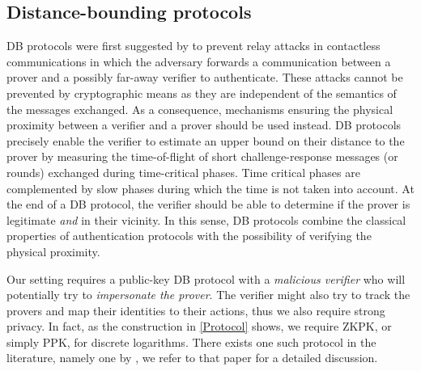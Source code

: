 \subsection{Distance-bounding protocols}%
\label{distance-bounding}

\Ac{DB} protocols were first suggested by \citet{DistanceBounding} to prevent relay attacks in contactless communications in which the adversary forwards a communication between a prover and a possibly far-away verifier to authenticate. 
These attacks cannot be prevented by cryptographic means as they are independent of the semantics of the messages exchanged.
As a consequence, mechanisms ensuring the physical proximity between a verifier and a prover should be used instead.
\Ac{DB} protocols precisely enable the verifier to estimate an upper bound on 
their distance to the prover by measuring the time-of-flight of short 
challenge-response messages (or rounds) exchanged during time-critical phases. 
Time critical phases are complemented by slow phases during which the time is 
not taken into account. At the end of a \Ac{DB} protocol, the verifier should 
be able to
determine if the prover is legitimate \emph{and} in their vicinity.
In this sense, \Ac{DB} protocols combine the classical properties of authentication protocols with the possibility of verifying the physical proximity.

Our setting requires a public-key \ac{DB} protocol with a \emph{malicious 
verifier} who will potentially try to \emph{impersonate the prover}.
The verifier might also try to track the provers and map their identities to 
their actions, thus we also require strong privacy.
In fact, as the construction in \cref{Protocol} shows, we require  
\ac{ZKPK}, or simply \ac{PPK}, for discrete logarithms.
There exists one such protocol in the literature, namely one by 
\textcite{DB-Schnorr}, we refer to that paper for a detailed discussion.

